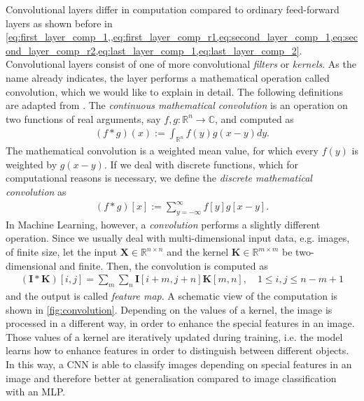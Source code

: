 Convolutional layers \cite{goodfellow_deep_2016} differ in computation compared to ordinary feed-forward layers as shown before in \cref{eq:first_layer_comp_1,,eq:first_layer_comp_r1,eq:second_layer_comp_1,eq:second_layer_comp_r2,eq:last_layer_comp_1,eq:last_layer_comp_2}. Convolutional layers consist of one of more convolutional \textit{filters} or \textit{kernels}. As the name already indicates, the layer performs a mathematical operation called convolution, which we would like to explain in detail. The following definitions are adapted from \cite{goodfellow_deep_2016}. The \textit{continuous mathematical convolution} is an operation on two functions of real arguments, say $f,g: \mathbb{R}^n \to \mathbb{C}$, and computed as
\begin{align}
    (f \ast g) (x) := \int_{\mathbb{R}^n} f(y) g(x-y)dy.
\end{align}
The mathematical convolution is a weighted mean value, for which every $f(y)$ is weighted by $g(x-y)$. If we deal with discrete functions, which for computational reasons is necessary, we define the \textit{discrete mathematical convolution} as
\begin{align}
    (f \ast g) [x] := \sum_{y=-\infty}^{\infty} f[y] g[x-y].
\end{align}
In Machine Learning, however, a \textit{convolution} performs a slightly different operation. Since we usually deal with multi-dimensional input data, e.g. images, of finite size, let the input $\mathbf{X} \in \mathbb{R}^{n \times n}$ and the kernel $\mathbf{K} \in \mathbb{R}^{m \times m}$ be two-dimensional and finite. Then, the convolution is computed as
\begin{align}
    (\mathbf{I} \ast \mathbf{K})[i,j] = \sum_m \sum_n \mathbf{I}[i+m,j+n] \mathbf{K}[m,n], \quad 1 \leq i,j \leq n-m+1
\end{align}
and the output is called \textit{feature map}. A schematic view of the computation is shown in \cref{fig:convolution}. Depending on the values of a kernel, the image is processed in a different way, in order to enhance the special features in an image. Those values of a kernel are iteratively updated during training, i.e. the model learns how to enhance features in order to distinguish between different objects. In this way, a CNN is able to classify images depending on special features in an image and therefore better at generalisation compared to image classification with an MLP.


